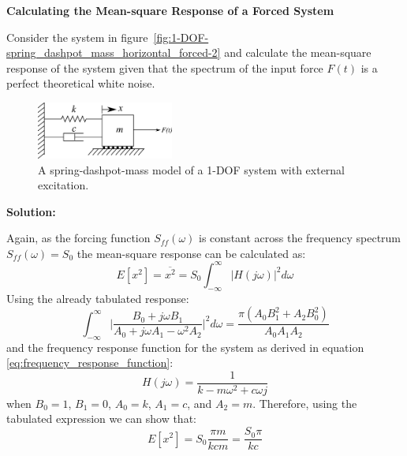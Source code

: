 \documentclass[12pt,letter]{article}
\begin{document}
\begin{example}

	\textbf{Calculating the Mean-square Response of a Forced System}

	\noindent Consider the system in figure~\ref{fig:1-DOF-spring_dashpot_mass_horizontal_forced-2} and calculate the mean-square response of the system given that the spectrum of the input force $F(t)$ is a perfect theoretical white noise.
	\begin{figure}[H]
		\centering
		\includegraphics[width=0.4\textwidth]{../figures/1-DOF-spring_dashpot_mass_horizontal_forced.png}
		\caption{A spring-dashpot-mass model of a 1-DOF system with external excitation.}
				\label{fig:1-DOF-spring_dashpot_mass_horizontal_forced-3}
	\end{figure}


	\noindent\textbf{Solution:}

	\noindent Again, as the forcing function $S_{ff}(\omega)$ is constant across the frequency spectrum $S_{ff}(\omega)=S_0$ the mean-square response can be calculated as:
	\begin{equation}
		E[x^2] = \overline{x^2} =   S_{0} \int_{-\infty}^{\infty} |H(j\omega)|^2 d\omega
	\end{equation}
	Using the already tabulated response:
	\begin{equation}
		\int_{-\infty}^{\infty} \bigg|\frac{B_0 + j \omega B_1}{A_0+j \omega A_1 - \omega^2 A_2} \bigg|^2 d\omega = \frac{\pi (A_0 B_1^2 + A_2 B_0^2)}{A_0 A_1 A_2}
	\end{equation} 
	and the frequency response function for the system as derived in equation \ref{eq:frequency_response_function}:
	\begin{equation}
		H(j\omega) = \frac{1}{k-m\omega^2+c\omega j}
	\end{equation}
	when $B_0=1$, $B_1 = 0$, $A_0=k$, $A_1=c$, and $A_2 =m$. Therefore, using the tabulated expression we can show that:
	\begin{equation}
		E[x^2] = S_0 \frac{\pi m }{k c m} =  \frac{S_0 \pi}{k c}
	\end{equation} 
\end{example}			
			
			
			
\end{document}
